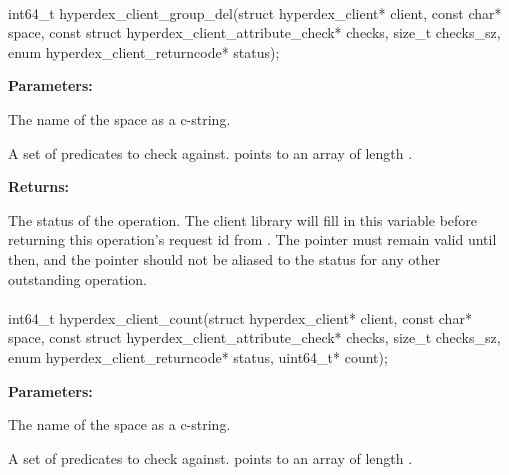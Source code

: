 \paragraph{}
\begin{ccode}
int64_t hyperdex_client_group_del(struct hyperdex_client* client,
                const char* space,
                const struct hyperdex_client_attribute_check* checks, size_t checks_sz,
                enum hyperdex_client_returncode* status);
\end{ccode}
\funcdesc 

\noindent\textbf{Parameters:}
\begin{description}[labelindent=\widthof{{\code{checks}, \code{checks\_sz}}},leftmargin=*,noitemsep,nolistsep,align=right]
\item[\code{space}] The name of the space as a c-string.
\item[\code{checks}, \code{checks\_sz}] A set of predicates to check against.   points to an array of length .
\end{description}

\noindent\textbf{Returns:}
\begin{description}[labelindent=\widthof{{\code{status}}},leftmargin=*,noitemsep,nolistsep,align=right]
\item[\code{status}] The status of the operation.  The client library will fill in this variable before returning this operation's request id from .  The pointer must remain valid until then, and the pointer should not be aliased to the status for any other outstanding operation.
\end{description}

\paragraph{}
\begin{ccode}
int64_t hyperdex_client_count(struct hyperdex_client* client,
                const char* space,
                const struct hyperdex_client_attribute_check* checks, size_t checks_sz,
                enum hyperdex_client_returncode* status,
                uint64_t* count);
\end{ccode}
\funcdesc 

\noindent\textbf{Parameters:}
\begin{description}[labelindent=\widthof{{\code{checks}, \code{checks\_sz}}},leftmargin=*,noitemsep,nolistsep,align=right]
\item[\code{space}] The name of the space as a c-string.
\item[\code{checks}, \code{checks\_sz}] A set of predicates to check against.   points to an array of length .
\end{description}


